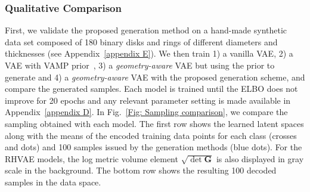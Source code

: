 \documentclass[10pt,journal,compsoc]{IEEEtran}
\begin{document}
        \subsubsection{Qualitative Comparison} \label{Subsec: qualitative comp}
        First, we validate the proposed generation method on a hand-made synthetic data set composed of 180 binary disks and rings of different diameters and thicknesses (see Appendix~\ref{appendix E}). We then train 1) a vanilla VAE, 2) a VAE with VAMP prior~\cite{tomczak_vae_2018}, 3) a \emph{geometry-aware} VAE but using the prior to generate and 4) a \emph{geometry-aware} VAE with the proposed generation scheme, and compare the generated samples. Each model is trained until the ELBO does not improve for 20 epochs and any relevant parameter setting is made available in Appendix~\ref{appendix D}. In Fig.~\ref{Fig: Sampling comparison}, we compare the sampling obtained with each model. The first row shows the learned latent spaces along with the means of the encoded training data points for each class (crosses and dots) and 100 samples issued by the generation methods (blue dots). For the RHVAE models, the log metric volume element $ \sqrt{\det \mathbf{G}}$ is also displayed in gray scale in the background. The bottom row shows the resulting 100 decoded samples in the data space. 
        
\end{document}
